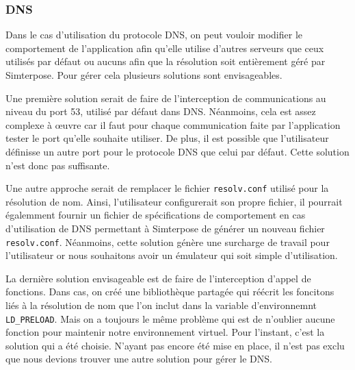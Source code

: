 \subsubsection{DNS}

Dans le cas d'utilisation du protocole DNS, on peut vouloir modifier le
comportement de l'application afin qu'elle utilise d'autres serveurs que ceux
utilisés par défaut ou aucuns afin que la résolution soit entièrement géré par
Simterpose. Pour gérer cela plusieurs solutions sont envisageables.

Une première solution serait de faire de l'interception de communications au
niveau du port 53, utilisé par défaut dans DNS. Néanmoins, cela est assez
complexe à \oe uvre car il faut pour chaque communication faite par
l'application tester le port qu'elle souhaite utiliser. De plus, il est possible que l'utilisateur définisse un autre port pour le protocole DNS que
celui par défaut. Cette solution n'est donc pas suffisante.

Une autre approche serait de remplacer le fichier \texttt{resolv.conf} utilisé
pour la résolution de nom. Ainsi, l'utilisateur configurerait son propre
fichier, il pourrait égalemment fournir un fichier de spécifications de
comportement en cas d'utilisation de DNS permettant à Simterpose de générer un
nouveau fichier \texttt{resolv.conf}. Néanmoins, cette solution génère une
surcharge de travail pour l'utilisateur or nous souhaitons avoir un émulateur
qui soit simple d'utilisation.

La dernière solution envisageable est de faire de l'interception d'appel de
fonctions. Dans cas, on créé une bibliothèque partagée qui réécrit les foncitons
liés à la résolution de nom que l'on inclut dans la variable d'environnemnt
\texttt{LD\_PRELOAD}. Mais on a toujours le même problème qui est de n'oublier
aucune fonction pour maintenir notre environnement virtuel. Pour l'instant,
c'est la solution qui a été choisie. N'ayant pas encore été mise en place, il
n'est pas exclu que nous devions trouver une autre solution pour gérer le DNS.

\vspace{0.5cm}
